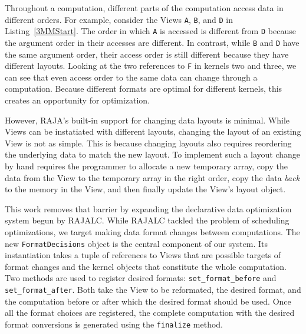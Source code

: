 \documentclass[sigconf, table]{acmart}
\begin{document}
Throughout a computation, different parts of the computation access data in different orders.
For example, consider the Views \verb.A., \verb.B., and \verb.D. in Listing~\ref{3MMStart}. 
The order in which \verb.A. is accessed is different from \verb.D. because the argument order in their accesses are different.
In contrast, while \verb.B. and \verb.D. have the same argument order, their access order is still different because they have different layouts.
Looking at the two references to \verb.F. in kernels two and three, we can see that even access order to the same data can change through a computation.
Because different formats are optimal for different kernels, this creates an opportunity for optimization. 

However, RAJA's built-in support for changing data layouts is minimal. 
While Views can be instatiated with different layouts, changing the layout of an existing View is not as simple.
This is because changing layouts also requires reordering the underlying data to match the new layout. 
To implement such a layout change by hand requires the programmer to allocate a new temporary array, 
copy the data from the View to the temporary array in the right order, 
copy the data \textit{back} to the memory in the View, 
and then finally update the View's layout object.

This work removes that barrier by expanding the declarative data optimization system begun by RAJALC.
While RAJALC tackled the problem of scheduling optimizations, we target making data format changes between computations. 
The new \verb.FormatDecisions. object is the central component of our system. 
Its instantiation takes a tuple of references to Views that are possible targets of format changes and the kernel objects that constitute the whole computation.
Two methods are used to register desired formats: \verb.set_format_before. and \verb.set_format_after..
Both take the View to be reformated, the desired format, and the computation before or after which the desired format should be used.
Once all the format choices are registered, the complete computation with the desired format conversions is generated using the \verb.finalize. method.
\end{document}
